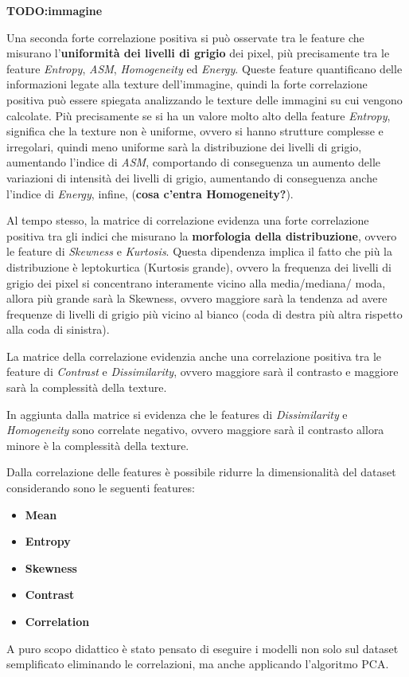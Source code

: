 \textbf{TODO:immagine}

Una seconda forte correlazione positiva si può osservate tra le feature che
misurano l'\textbf{uniformità dei livelli di grigio} dei pixel, più precisamente
tra le feature \textit{Entropy}, \textit{ASM}, \textit{Homogeneity} ed
\textit{Energy}. Queste feature quantificano delle informazioni legate alla
texture dell'immagine, quindi la forte correlazione positiva può essere spiegata
analizzando le texture delle immagini su cui vengono calcolate. Più precisamente
se si ha un valore molto alto della feature \textit{Entropy}, significa che la
texture non è uniforme, ovvero si hanno strutture complesse e irregolari, quindi
meno uniforme sarà la distribuzione dei livelli di grigio, aumentando l'indice
di \textit{ASM}, comportando di conseguenza un aumento delle variazioni di intensità
dei livelli di grigio, aumentando di conseguenza anche l'indice di \textit{Energy},
infine, (\textbf{cosa c'entra Homogeneity?}).

Al tempo stesso, la matrice di correlazione evidenza una forte correlazione positiva
tra gli indici che misurano la \textbf{morfologia della distribuzione}, ovvero
le feature di \textit{Skewness} e \textit{Kurtosis}. Questa dipendenza implica il
fatto che più la distribuzione è leptokurtica (Kurtosis grande), ovvero la frequenza
dei livelli di grigio dei pixel si concentrano interamente vicino alla media/mediana/
moda, allora più grande sarà la Skewness, ovvero maggiore sarà la tendenza ad avere
frequenze di livelli di grigio più vicino al bianco (coda di destra più altra rispetto
alla coda di sinistra).

La matrice della correlazione evidenzia anche una correlazione positiva tra le
feature di \textit{Contrast} e \textit{Dissimilarity}, ovvero maggiore sarà il
contrasto e maggiore sarà la complessità della texture.

In aggiunta dalla matrice si evidenza che le features di \textit{Dissimilarity}
e \textit{Homogeneity} sono correlate negativo, ovvero maggiore sarà il contrasto
allora minore è la complessità della texture.

Dalla correlazione delle features è possibile ridurre la dimensionalità del dataset
considerando sono le seguenti features:
\begin{itemize}
      \item \textbf{Mean}
      \item \textbf{Entropy}
      \item \textbf{Skewness}
      \item \textbf{Contrast}
      \item \textbf{Correlation}
\end{itemize}
A puro scopo didattico è stato pensato di eseguire i modelli non solo sul dataset
semplificato eliminando le correlazioni, ma anche applicando l'algoritmo PCA.

